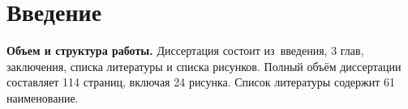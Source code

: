 \chapter*{Введение}                         %

\newcommand{\actuality}{{\textbf\actualityTXT}}
\newcommand{\progress}{}
\newcommand{\aim}{{\textbf\aimTXT}}
\newcommand{\tasks}{\textbf{\tasksTXT}}
\newcommand{\novelty}{\textbf{\noveltyTXT}}
\newcommand{\influence}{\textbf{\influenceTXT}}
\newcommand{\methods}{\textbf{\methodsTXT}}
\newcommand{\defpositions}{\textbf{\defpositionsTXT}}
\newcommand{\reliability}{\textbf{\reliabilityTXT}}
\newcommand{\probation}{\textbf{\probationTXT}}
\newcommand{\contribution}{\textbf{\contributionTXT}}
\newcommand{\publications}{\textbf{\publicationsTXT}}




\textbf{Объем и структура работы.} 
Диссертация состоит из~введения, 
3 глав, заключения, списка литературы и списка рисунков.
Полный объём диссертации составляет
114 страниц, включая
24 рисунка.
Список литературы содержит
61 наименование.



